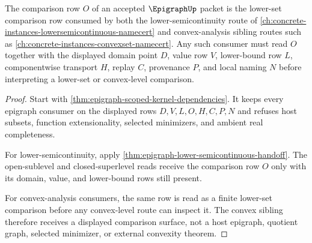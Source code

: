 \begin{theorem}
\label{thm:epigraph-mature-crosslink}
The comparison row $O$ of an accepted $\EpigraphUp$ packet is the lower-set comparison row consumed by both the lower-semicontinuity route of \autoref{ch:concrete-instances-lowersemicontinuous-namecert} and convex-analysis sibling routes such as \autoref{ch:concrete-instances-convexset-namecert}. Any such consumer must read $O$ together with the displayed domain point $D$, value row $V$, lower-bound row $L$, componentwise transport $H$, replay $C$, provenance $P$, and local naming $N$ before interpreting a lower-set or convex-level comparison.
\end{theorem}
\begin{proof}
Start with \autoref{thm:epigraph-scoped-kernel-dependencies}. It keeps every epigraph consumer on the displayed rows $D,V,L,O,H,C,P,N$ and refuses host subsets, function extensionality, selected minimizers, and ambient real completeness.

For lower-semicontinuity, apply \autoref{thm:epigraph-lower-semicontinuous-handoff}. The open-sublevel and closed-superlevel reads receive the comparison row $O$ only with its domain, value, and lower-bound rows still present.

For convex-analysis consumers, the same row is read as a finite lower-set comparison before any convex-level route can inspect it. The convex sibling therefore receives a displayed comparison surface, not a host epigraph, quotient graph, selected minimizer, or external convexity theorem.
\end{proof}

